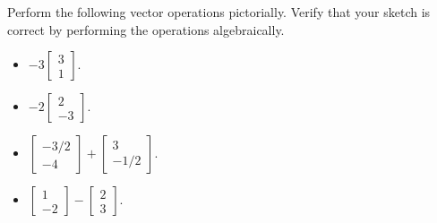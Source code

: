 \documentclass[../main.tex]{subfiles}
\begin{document}
\begin{exercise}
  Perform the following vector operations pictorially.  Verify that your sketch is correct by performing the operations algebraically.

  \begin{itemize}
    \item \(-3 \begin{bmatrix} 3 \\ 1 \end{bmatrix}\).
    \item \(-2 \begin{bmatrix} 2 \\ -3 \end{bmatrix}\).
    \item \(\begin{bmatrix} -3/2 \\ -4 \end{bmatrix} + \begin{bmatrix} 3 \\ -1/2 \end{bmatrix}\).
    \item \(\begin{bmatrix} 1 \\ -2 \end{bmatrix} - \begin{bmatrix} 2 \\ 3 \end{bmatrix}\).
  \end{itemize}

  \begin{solution} 
    \phantom{top}


\end{solution}
\end{exercise}
\end{document}
